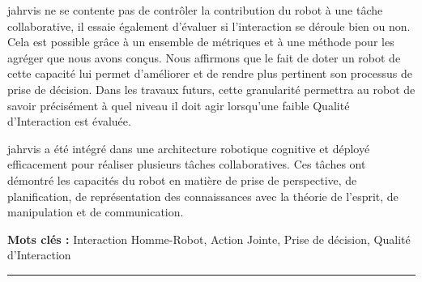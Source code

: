\documentclass[english,a4paper,11pt,twoside]{StyleThese}
\begin{document}
\begin{vcenterpage}
\acrshort{jahrvis} ne se contente pas de contrôler la contribution du robot à une tâche collaborative, il essaie également d'évaluer si l'interaction se déroule bien ou non. Cela est possible grâce à un ensemble de métriques et à une méthode pour les agréger que nous avons conçus. Nous affirmons que le fait de doter un robot de cette capacité lui permet d'améliorer et de rendre plus pertinent son processus de prise de décision. Dans les travaux futurs, cette granularité permettra au robot de savoir précisément à quel niveau il doit agir lorsqu'une faible Qualité d'Interaction est évaluée.

\acrshort{jahrvis} a été intégré dans une architecture robotique cognitive et déployé efficacement pour réaliser plusieurs tâches collaboratives. Ces tâches ont démontré les capacités du robot en matière de prise de perspective, de planification, de représentation des connaissances avec la théorie de l'esprit, de manipulation et de communication.

\textbf{Mots clés :} Interaction Homme-Robot, Action Jointe, Prise de décision, Qualité d'Interaction
\\
\noindent\rule{\textwidth}{0.5pt}
\end{vcenterpage}
\end{document}
